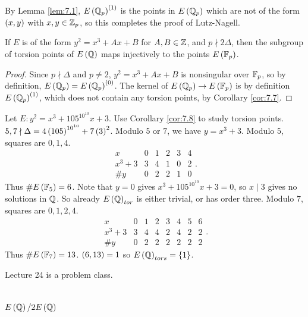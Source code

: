 By Lemma \ref{lem:7.1}, $ E\left( \mathbb{Q}_p \right)^{\left( 1 \right)} $ is the points in $ E\left( \mathbb{Q}_p \right) $ which are not of the form $ \left( x, y \right) $ with $ x, y \in \mathbb{Z}_p $, so this completes the proof of Lutz-Nagell.

\begin{corollary}
\label{cor:7.8}
If $ E $ is of the form $ y^2 = x^3 + Ax + B $ for $ A, B \in \mathbb{Z} $, and $ p \nmid 2\Delta $, then the subgroup of torsion points of $ E\left( \mathbb{Q} \right) $ maps injectively to the points $ E\left( \mathbb{F}_p \right) $.
\end{corollary}

\begin{proof}
Since $ p \nmid \Delta $ and $ p \ne 2 $, $ y^2 = x^3 + Ax + B $ is nonsingular over $ \mathbb{F}_p $, so by definition, $ E\left( \mathbb{Q}_p \right) = E\left( \mathbb{Q}_p \right)^{\left( 0 \right)} $. The kernel of $ E\left( \mathbb{Q}_p \right) \to E\left( \mathbb{F}_p \right) $ is by definition $ E\left( \mathbb{Q}_p \right)^{\left( 1 \right)} $, which does not contain any torsion points, by Corollary \ref{cor:7.7}.
\end{proof}

\begin{example*}
Let $ E : y^2 = x^3 + 105^{10^{10}}x + 3 $. Use Corollary \ref{cor:7.8} to study torsion points. $ 5, 7 \nmid \Delta = 4\left( 105 \right)^{10^{10}} + 7\left( 3 \right)^2 $. Modulo $ 5 $ or $ 7 $, we have $ y = x^3 + 3 $. Modulo $ 5 $, squares are $ 0, 1, 4 $.
$$
\begin{array}{c|ccccc}
x & 0 & 1 & 2 & 3 & 4 \\
\hline
x^3 + 3 & 3 & 4 & 1 & 0 & 2 \\
\#y & 0 & 2 & 2 & 1 & 0
\end{array}.
$$
Thus $ \#E\left( \mathbb{F}_5 \right) = 6 $. Note that $ y = 0 $ gives $ x^3 + 105^{10^{10}}x + 3 = 0 $, so $ x \mid 3 $ gives no solutions in $ \mathbb{Q} $. So already $ E\left( \mathbb{Q} \right)_{tor} $ is either trivial, or has order three. Modulo $ 7 $, squares are $ 0, 1, 2, 4 $.
$$
\begin{array}{c|ccccccc}
x & 0 & 1 & 2 & 3 & 4 & 5 & 6 \\
\hline
x^3 + 3 & 3 & 4 & 4 & 2 & 4 & 2 & 2 \\
\#y & 0 & 2 & 2 & 2 & 2 & 2 & 2
\end{array}.
$$
Thus $ \#E\left( \mathbb{F}_7 \right) = 13 $. $ \left( 6, 13 \right) = 1 $ so $ E\left( \mathbb{Q} \right)_{tors} = \left\{ 1 \right\} $.
\end{example*}


Lecture 24 is a problem class.

\pagebreak

\section{$ E\left( \mathbb{Q} \right) / 2E\left( \mathbb{Q} \right) $}

